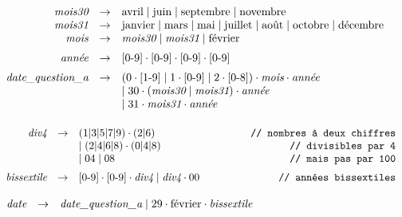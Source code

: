 \begin{corrections}

  \begin{questions}

  \item $\begin{array}[t]{rcl}
    \textit{mois30} &\rightarrow& \text{avril} \mid \text{juin} \mid \text{septembre} \mid \text{novembre}\\
    \textit{mois31} &\rightarrow& \text{janvier} \mid \text{mars} \mid \text{mai} \mid \text{juillet} \mid \text{août} \mid \text{octobre} \mid \text{décembre}\\
    \textit{mois} &\rightarrow& \textit{mois30} \mid \textit{mois31} \mid \text{février} \vspace{2mm}\\
    \textit{année} &\rightarrow& \text{[0-9]}\cdot\text{[0-9]}\cdot\text{[0-9]}\cdot\text{[0-9]}\vspace{2mm}\\
    \textit{date\_question\_a} &\rightarrow& (0\cdot\text{[1-9]} \mid 1\cdot\text{[0-9]} \mid 2\cdot\text{[0-8]}) \cdot \textit{mois} \cdot \textit{année}\\
    &&\mid 30  \cdot (\textit{mois30}\mid\textit{mois31}) \cdot \textit{année} \\
    &&\mid 31  \cdot \textit{mois31} \cdot \textit{année} \\
  \end{array}$

  \item $\begin{array}[t]{rcl}
    \textit{div4} &\rightarrow& (1 | 3 | 5 | 7 | 9) \cdot (2 | 6)  ~~~~~~~~~~~~~~~~~~~~~~~~~~~ \texttt{// nombres à deux chiffres}\\
    &&\mid (2 | 4 | 6 | 8) \cdot (0 | 4 | 8)                       \hspace\fill \texttt{// divisibles par 4}\\
    &&\mid 04 \mid 08                                              \hspace\fill \texttt{// mais pas par 100}\vspace{2mm}\\
    \textit{bissextile} &\rightarrow& \text{[0-9]}\cdot\text{[0-9]} \cdot \textit{div4} \mid \textit{div4} \cdot 0 0  \hspace\fill \texttt{// années bissextiles}\\
  \end{array}$

  \item $\begin{array}[t]{rcl}
    \textit{date} &\rightarrow& \textit{date\_question\_a} \mid 29  \cdot \text{février} \cdot \textit{bissextile} \\
  \end{array}$

  \end{questions}

\end{corrections}

\endgroup
\endinput
